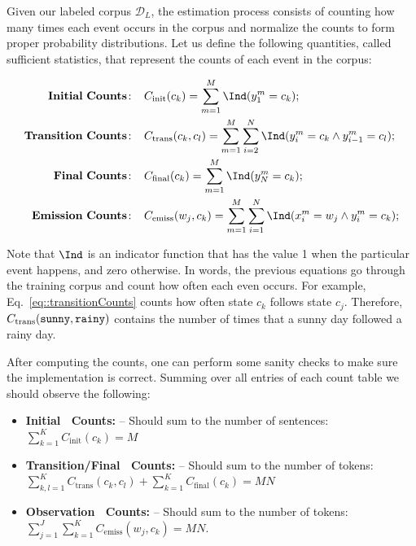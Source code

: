 Given our labeled corpus $\mathcal{D}_L$, the estimation process consists of counting how
many times each event occurs in the corpus and normalize the counts to
form proper probability distributions. Let us define the following
quantities, called sufficient statistics, that represent the counts of
each event in the corpus:

\begin{align}
\mathbf{Initial \ Counts\!:}\;\;\;\;  &  C_{\mathrm{init}}(c_k) = \sum_{m=1}^M
\Ind (y^m_1 = c_k); \label{eq::initialCounts}\\
%
%
\mathbf{Transition \ Counts\!:}\;\;\;\;  &  C_{\mathrm{trans}}(c_k,c_l) =
\sum_{m=1}^M  \sum_{i = 2}^{N}
\Ind (y^m_i = c_k \wedge y^m_{i-1} = c_l); \label{eq::transitionCounts}\\
%
\mathbf{Final \ Counts\!:}\;\;\;\;  &  C_{\mathrm{final}}(c_k) = \sum_{m=1}^M
\Ind (y^m_N = c_k); \label{eq::finalCounts}\\
%
\mathbf{Emission \ Counts\!:}\;\;\;\;  &  
C_{\mathrm{emiss}}(w_j,c_k) = \sum_{m=1}^M
\sum_{i = 1}^{N}
\Ind (x^m_i = w_j \wedge y^m_i = c_k); \label{eq::emissionCounts}
\end{align}

Note that $\Ind$ is an indicator function that has the value 1 when the
particular event happens, and zero otherwise. In words, the previous
equations go through the training corpus and count how
often each even occurs. For example, Eq.~\ref{eq::transitionCounts} counts how often state $c_k$ follows state $c_j$. Therefore, $C_{\mathrm{trans}}(\text{\tt sunny},\text{\tt rainy})$ contains the number of times that a sunny day followed a rainy day.

%


After computing the counts, one can perform some sanity checks
to make sure the implementation is correct. Summing over all entries
of each count table we should observe the following:

\begin{itemize}
\item \textbf{Initial \ Counts\!:} -- Should sum to the number of
  sentences: $\sum_{k=1}^K C_{\mathrm{init}}(c_k) = M$
\item \textbf{Transition/Final \ Counts\!:} -- Should sum to the number of
  tokens: 
  $\sum_{k,l=1}^K C_{\mathrm{trans}}(c_k,c_l) + \sum_{k=1}^K C_{\mathrm{final}}(c_k) = MN$
\item \textbf{Observation \ Counts\!:} -- Should sum to the number of tokens: $\sum_{j=1}^J\sum_{k=1}^K C_{\mathrm{emiss}}(w_j,c_k) = MN$.
\end{itemize}

